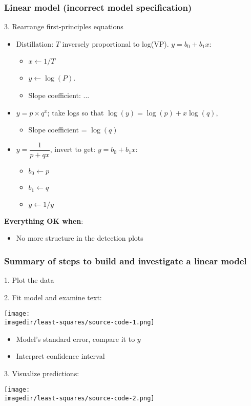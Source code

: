 \begin{frame}\frametitle{Linear model (incorrect model specification)}

	3. Rearrange first-principles equations
	\begin{itemize}
		\item	Distillation: $T$ inversely proportional to log(VP). $y = b_0 + b_1x$:
		\begin{itemize}
			\item	$x \leftarrow 1/T$
			\item	$y \leftarrow \log(P)$.
			\item	Slope coefficient: ...
		\end{itemize}
		\item	$y = p \times q^x$; take logs so that $\log(y) = \log(p) + x \log(q)$,
		\begin{itemize}
			\item	Slope coefficient = $\log(q)$
		\end{itemize}
		\item	$y = \dfrac{1}{p+qx}$, invert to get: $y = b_0 + b_1 x$:
		\begin{itemize}
			\item	$b_0 \leftarrow p$
			\item	$b_1 \leftarrow q$
			\item	$y\leftarrow 1/y$
		\end{itemize}
	\end{itemize}

	\textbf{Everything OK when}:
	\begin{itemize}
		\item	No more structure in the detection plots
	\end{itemize}
\end{frame}

\begin{frame}\frametitle{Summary of steps to build and investigate a linear model}

	1. Plot the data

	2. Fit model and examine text:
	\begin{center}
		\texttt{[image: \\imagedir/least-squares/source-code-1.png]}
	\end{center}
	\begin{itemize}
		\item	Model's standard error, compare it to $y$
		\item	Interpret confidence interval
	\end{itemize}

	3. Visualize predictions:
	\begin{center}
		\texttt{[image: \\imagedir/least-squares/source-code-2.png]}
	\end{center}
\end{frame}

